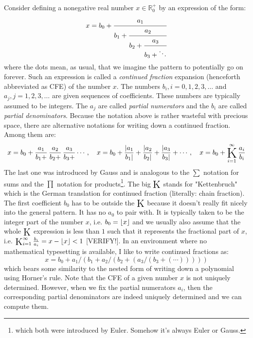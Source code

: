 Consider defining a nonegative real number $x \in \mathbb{R}_0^+$ by an expression of the form:
\begin{equation}
\label{Eq:ContinuedFraction}
x = b_0 + \cfrac{a_1}{b_1 + \cfrac{a_2}{b_2 + \cfrac{a_3}{b_3 + \ddots }}}
\end{equation}
where the dots mean, as usual, that we imagine the pattern to potentially go on forever. Such an expression is called a \emph{continued fraction} expansion (henceforth abbreviated as CFE) of the number $x$. The numbers $b_i, i = 0,1,2,3,\ldots$ and $a_j, j = 1,2,3,\ldots$ are given sequences of coefficients. These numbers are typically assumed to be integers. The $a_j$ are called \emph{partial numerators} and the $b_i$ are called \emph{partial denominators}. Because the notation above is rather wasteful with precious space, there are alternative notations for writing down a continued fraction. Among them are:
\begin{equation}
x = b_0 + \frac{a_1}{b_1 +} \, \frac{a_2}{b_2 +} \, \frac{a_3}{b_3 +} \cdots, \quad
x = b_0 + \frac{|a_1}{b_1|} + \frac{|a_2}{b_2|} + \frac{|a_3}{b_3|} + \cdots, \quad
x = b_0 + \opK_{i=1}^{\infty} \frac{a_i}{b_i}
\end{equation}
The last one was introduced by Gauss and is analogous to the $\sum$ notation for sums and the $\prod$ notation for products\footnote{which both were introduced by Euler. Somehow it's always Euler or Gauss.}. The big $\opK$ stands for "Kettenbruch" which is the German translation for continued fraction (literally: chain fraction). The first coefficient $b_0$ has to be outside the $\opK$ because it doesn't really fit nicely into the general pattern. It has no $a_0$ to pair with. It is typically taken to be the integer part of the number $x$, i.e. $b_0 =\lfloor x\rfloor$ and we usually also assume that the whole $\opK$ expression is less than $1$ such that it represents the fractional part of $x$, i.e. $\opK_{i=1}^{\infty} \frac{b_i}{a_i} = x - \floor{x} < 1$ [VERIFY!]. In an environment where no mathematical typesetting is available, I like to write continued fractions as:
\begin{equation}
x = b_0 + a_1 / (b_1 + a_2 / (b_2 + (a_3 /  (b_3 + (\cdots))))) 
\end{equation}
which bears some similarity to the nested form of writing down a polynomial using Horner's rule. Note that the CFE of a given number $x$ is not uniquely determined. However, when we fix the partial numerators $a_i$, then the corresponding partial denominators are indeed uniquely determined and we can compute them.
